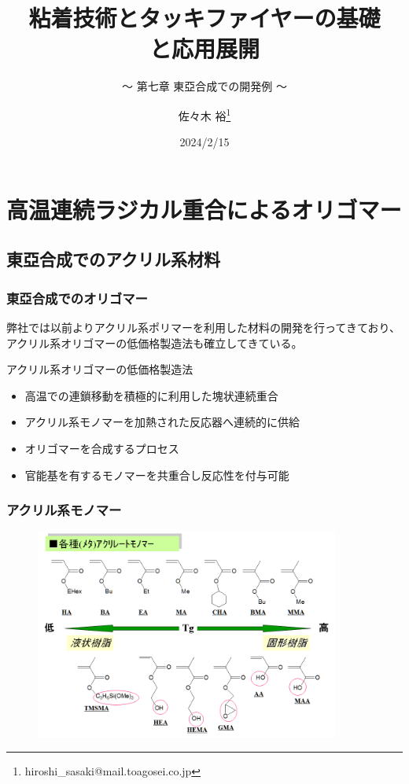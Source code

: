 \documentclass[unicode,12pt]{beamer}%
\title{粘着技術とタッキファイヤーの基礎\\と応用展開}
\subtitle{～ 第七章 東亞合成での開発例 ～}
\author[東亞合成 佐々木]{佐々木 裕\thanks{hiroshi\_sasaki@mail.toagosei.co.jp}}
\institute[東亞合成]{東亞合成株式会社}
\date{2024/2/15}
\begin{document}
\maketitle

\begin{frame} 
    \tableofcontents[]
\end{frame} 

\section{高温連続ラジカル重合によるオリゴマー}
\subsection{東亞合成でのアクリル系材料}
\begin{frame}
	\frametitle{東亞合成でのオリゴマー}
		弊社では以前よりアクリル系ポリマーを利用した材料の開発を行ってきており、アクリル系オリゴマーの低価格製造法も確立してきている。

		\begin{block}{アクリル系オリゴマーの低価格製造法}
		\begin{itemize}
		\item 高温での連鎖移動を積極的に利用した塊状連続重合
		\item アクリル系モノマーを加熱された反応器へ連続的に供給
		\item オリゴマーを合成するプロセス
		\item 官能基を有するモノマーを共重合し反応性を付与可能
		\end{itemize}
		\end{block}
\end{frame}

\begin{frame}\frametitle{アクリル系モノマー}
\begin{figure}[!b]
	\begin{center}
		\includegraphics[width=100mm]{monomers.png}
	\end{center}
\end{figure}
\end{frame}
\end{document}
